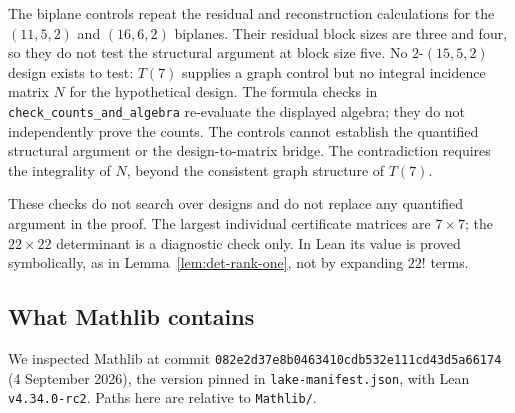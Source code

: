 \documentclass[11pt]{article}
\theoremstyle{definition}
\newcommand{\code}[1]{{\small\nolinkurl{#1}}}
\begin{document}
The biplane controls repeat the residual and reconstruction calculations
for the $(11,5,2)$ and $(16,6,2)$
biplanes. Their residual block sizes are three and four, so they do
not test the structural argument at block size five. No
$2$-$(15,5,2)$ design exists to test: $T(7)$ supplies a graph control but
no integral incidence matrix $N$ for the hypothetical design. The
formula checks in \code{check_counts_and_algebra} re-evaluate the
displayed algebra; they do not independently prove the counts. The
controls cannot establish the quantified structural argument or the
design-to-matrix bridge. The contradiction requires the integrality
of $N$, beyond the consistent graph structure of $T(7)$.

These checks do not search over designs and do not replace any
quantified argument in the proof. The largest individual certificate
matrices are $7\times7$; the $22\times22$ determinant is a diagnostic
check only. In Lean its value is proved symbolically, as in
Lemma~\ref{lem:det-rank-one}, not by expanding $22!$ terms.

\subsection*{What Mathlib contains}

We inspected Mathlib at commit
\code{082e2d37e8b0463410cdb532e111cd43d5a66174} (4 September 2026),
the version pinned in \code{lake-manifest.json}, with Lean
\code{v4.34.0-rc2}. Paths here are relative to
\code{Mathlib/}.
\end{document}
